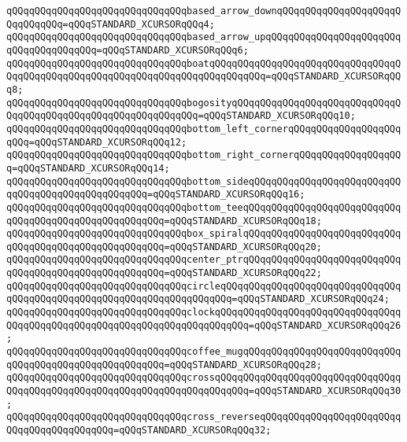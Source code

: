 \verb|qQQqqQQqqQQqqQQqqQQqqQQqqQQqqQQqbased_arrow_downqQQqqQQqqQQqqQQqqQQqqQQqqQQqqQQq=qQQqSTANDARD_XCURSORqQQq4;|\newline
\verb|qQQqqQQqqQQqqQQqqQQqqQQqqQQqqQQqbased_arrow_upqQQqqQQqqQQqqQQqqQQqqQQqqQQqqQQqqQQqqQQq=qQQqSTANDARD_XCURSORqQQq6;|\newline
\verb|qQQqqQQqqQQqqQQqqQQqqQQqqQQqqQQqboatqQQqqQQqqQQqqQQqqQQqqQQqqQQqqQQqqQQqqQQqqQQqqQQqqQQqqQQqqQQqqQQqqQQqqQQqqQQqqQQq=qQQqSTANDARD_XCURSORqQQq8;|\newline
\verb|qQQqqQQqqQQqqQQqqQQqqQQqqQQqqQQqbogosityqQQqqQQqqQQqqQQqqQQqqQQqqQQqqQQqqQQqqQQqqQQqqQQqqQQqqQQqqQQqqQQq=qQQqSTANDARD_XCURSORqQQq10;|\newline
\verb|qQQqqQQqqQQqqQQqqQQqqQQqqQQqqQQqbottom_left_cornerqQQqqQQqqQQqqQQqqQQqqQQq=qQQqSTANDARD_XCURSORqQQq12;|\newline
\verb|qQQqqQQqqQQqqQQqqQQqqQQqqQQqqQQqbottom_right_cornerqQQqqQQqqQQqqQQqqQQq=qQQqSTANDARD_XCURSORqQQq14;|\newline
\verb|qQQqqQQqqQQqqQQqqQQqqQQqqQQqqQQqbottom_sideqQQqqQQqqQQqqQQqqQQqqQQqqQQqqQQqqQQqqQQqqQQqqQQqqQQq=qQQqSTANDARD_XCURSORqQQq16;|\newline
\verb|qQQqqQQqqQQqqQQqqQQqqQQqqQQqqQQqbottom_teeqQQqqQQqqQQqqQQqqQQqqQQqqQQqqQQqqQQqqQQqqQQqqQQqqQQqqQQq=qQQqSTANDARD_XCURSORqQQq18;|\newline
\verb|qQQqqQQqqQQqqQQqqQQqqQQqqQQqqQQqbox_spiralqQQqqQQqqQQqqQQqqQQqqQQqqQQqqQQqqQQqqQQqqQQqqQQqqQQqqQQq=qQQqSTANDARD_XCURSORqQQq20;|\newline
\verb|qQQqqQQqqQQqqQQqqQQqqQQqqQQqqQQqcenter_ptrqQQqqQQqqQQqqQQqqQQqqQQqqQQqqQQqqQQqqQQqqQQqqQQqqQQqqQQq=qQQqSTANDARD_XCURSORqQQq22;|\newline
\verb|qQQqqQQqqQQqqQQqqQQqqQQqqQQqqQQqcircleqQQqqQQqqQQqqQQqqQQqqQQqqQQqqQQqqQQqqQQqqQQqqQQqqQQqqQQqqQQqqQQqqQQqqQQq=qQQqSTANDARD_XCURSORqQQq24;|\newline
\verb|qQQqqQQqqQQqqQQqqQQqqQQqqQQqqQQqclockqQQqqQQqqQQqqQQqqQQqqQQqqQQqqQQqqQQqqQQqqQQqqQQqqQQqqQQqqQQqqQQqqQQqqQQqqQQq=qQQqSTANDARD_XCURSORqQQq26;|\newline
\verb|qQQqqQQqqQQqqQQqqQQqqQQqqQQqqQQqcoffee_mugqQQqqQQqqQQqqQQqqQQqqQQqqQQqqQQqqQQqqQQqqQQqqQQqqQQqqQQq=qQQqSTANDARD_XCURSORqQQq28;|\newline
\verb|qQQqqQQqqQQqqQQqqQQqqQQqqQQqqQQqcrossqQQqqQQqqQQqqQQqqQQqqQQqqQQqqQQqqQQqqQQqqQQqqQQqqQQqqQQqqQQqqQQqqQQqqQQqqQQq=qQQqSTANDARD_XCURSORqQQq30;|\newline
\verb|qQQqqQQqqQQqqQQqqQQqqQQqqQQqqQQqcross_reverseqQQqqQQqqQQqqQQqqQQqqQQqqQQqqQQqqQQqqQQqqQQq=qQQqSTANDARD_XCURSORqQQq32;|\newline

